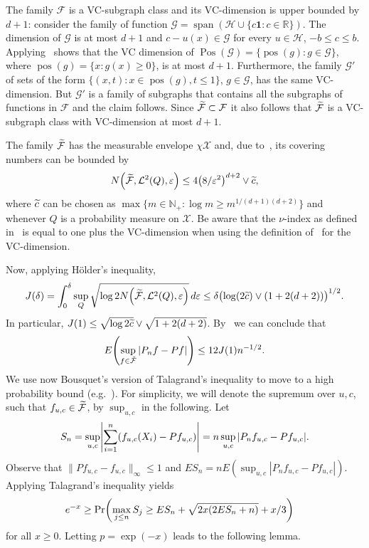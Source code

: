 \documentclass[AHL,Unicode,longabstracts,published]{cedram}
\theoremstyle{remark}
\DeclareMathOperator{\POS}{Pos}
\DeclareMathOperator{\pos}{pos}
\DeclareMathOperator{\spn}{span}
\newcommand{\R}{\mathbb{R}}
\newcommand{\bbN}{\mathbb{N}}
\newcommand{\X}{\mathcal{X}}
\newcommand{\cH}{\mathcal{H}}
\newcommand{\clL}{\mathcal{L}}
\newcommand{\clF}{\mathcal{F}}
\newcommand{\clG}{\mathcal{G}}
\let\oldtilde\tilde
\renewcommand*{\tilde}[1]{\mathchoice{\widetilde{#1}}{\widetilde{#1}}{\oldtilde{#1}}{\oldtilde{#1}}}
\let\originalleft\left
\let\originalright\right
\renewcommand{\left}{\mathopen{}\mathclose\bgroup\originalleft}
\renewcommand{\right}{\aftergroup\egroup\originalright}
\begin{document}
The family $\clF$ is a VC-subgraph class and its VC-dimension is upper bounded by $d+1$: consider the family of function $\clG = \spn(\cH \cup \{ c\bm 1 : c \in \R \})$. The dimension of $\clG$ is at most $d+1$ and $c - u(x) \in \clG$ for every $u \in \cH$, $-b \leq c \leq b$. Applying~\cite[Theorem~4.6]{DUDLEY14} shows that the VC dimension of $\POS(\clG) = \{ \pos(g) : g \in \clG\}$, where $\pos(g) = \{x: g(x) \geq 0 \}$, is at most $d+1$. Furthermore, the family $\clG'$ of sets of the form $\{(x,t) : x \in \pos(g), t \leq 1\}$, $g \in \clG$, has the same VC-dimension. But $\clG'$ is a family of subgraphs that contains all the subgraphs of functions in $\clF$ and the claim follows. Since $\tilde{\clF} \subset \clF$ it also follows that $\tilde{\clF}$ is a VC-subgraph class with VC-dimension at most $d+1$.

The family $\tilde{\clF}$ has the measurable envelope $\chi \X$ and, due to~\cite[Theorem~3.6.9]{GINE15}, its covering numbers can be bounded by
\[
N\left(\tilde{\clF},\clL^2(Q),\varepsilon\right) \leq 4 \left(8/\varepsilon^2\right)^{d+2} \vee \tilde c,
\]
where $\tilde c$ can be chosen as $\max\{m\in \bbN_+ : \log m \geq m^{1/(d+1)(d+2)} \}$ and whenever $Q$ is a probability measure on $\X$. Be aware that the $\nu$-index as defined in~\cite{GINE15} is equal to one plus the VC-dimension when using the definition of~\cite{DUDLEY14} for the VC-dimension.

Now, applying H\"older's inequality,
\begin{align*}
J(\delta) = \int_0^\delta \sup_Q \sqrt{\log 2 N\left(\tilde{\clF},\clL^2(Q),\varepsilon\right)} \, d\varepsilon
\leq \delta \bigl(
\log(2\tilde c)
\vee (1 + 2(d+2))
\bigr)^{1/2}.
\end{align*}
In particular, $J(1) \leq \sqrt{\log 2\tilde c} \vee \sqrt{1+ 2(d+2)}$. By~\cite[Remark~3.5.5 and Theorem~3.5.4]{GINE15} we can conclude that
\[
E\left(\sup_{f \in \tilde{\clF}} |P_n f - P f|\right) \leq 12 J(1) n^{-1/2}.
\]
We use now Bousquet's version of Talagrand's inequality to move to a high probability bound (e.g.~\cite[Theorem~3.3.9]{GINE15}). For simplicity, we will denote the supremum over $u,c$, such that $f_{u,c} \in \tilde{\clF}$, by $\sup_{u,c}$ in the following. Let
\[
S_n = \sup_{u,c} \left|\sum_{i=1}^n (f_{u,c}(X_i)- Pf_{u,c})\right|= n \sup_{u,c} | P_n f_{u,c} - P f_{u,c}|.
\]
Observe that $\| Pf_{u,c} - f_{u,c}\|_{\infty} \leq 1$ and $E S_n = n E(\sup_{u,c} |P_n f_{u,c} - P f_{u,c}|)$. Applying Talagrand's inequality yields
\begin{align*}
e^{-x} &\geq \Pr\left(\max_{j\leq n} S_j \geq E S_n + \sqrt{2x(2 E S_n + n)} +x/3 \right)
\end{align*}
for all $x\geq 0$. Letting $p = \exp(-x)$ leads to the following lemma.
\end{document}
